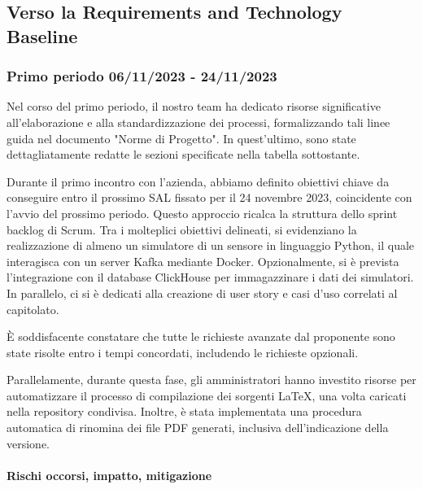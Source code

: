 \subsection{Verso la Requirements and Technology Baseline}
\subsubsection{Primo periodo  06/11/2023 - 24/11/2023}
    Nel corso del primo periodo, il nostro team ha dedicato risorse significative all'elaborazione e alla standardizzazione dei processi, formalizzando tali linee guida nel documento "Norme di Progetto". In quest'ultimo, sono state dettagliatamente redatte le sezioni specificate nella tabella sottostante.

    Durante il primo incontro con l'azienda, abbiamo definito obiettivi chiave da conseguire entro il prossimo SAL fissato per il 24 novembre 2023, coincidente con l'avvio del prossimo periodo. Questo approccio ricalca la struttura dello sprint backlog di Scrum.
    Tra i molteplici obiettivi delineati, si evidenziano la realizzazione di almeno un simulatore di un sensore in linguaggio Python, il quale interagisca con un server Kafka mediante Docker. Opzionalmente, si è prevista l'integrazione con il database ClickHouse per immagazzinare i dati dei simulatori. In parallelo, ci si è dedicati alla creazione di user story e casi d'uso correlati al capitolato.

    È soddisfacente constatare che tutte le richieste avanzate dal proponente sono state risolte entro i tempi concordati, includendo le richieste opzionali.

    Parallelamente, durante questa fase, gli amministratori hanno investito risorse per automatizzare il processo di compilazione dei sorgenti \LaTeX , una volta caricati nella repository condivisa. Inoltre, è stata implementata una procedura automatica di rinomina dei file PDF generati, inclusiva dell'indicazione della versione.

\paragraph{Rischi occorsi, impatto, mitigazione} 

